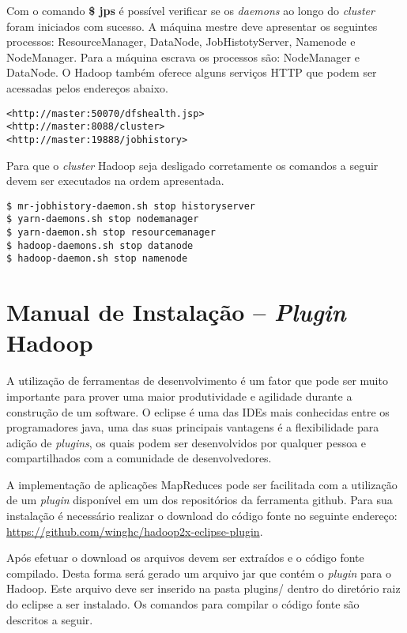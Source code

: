 \begin{apendicesenv}
Com o comando \textbf{\$ jps} é possível verificar se os \textit{daemons} ao longo do \textit{cluster} foram iniciados com sucesso. A máquina mestre deve apresentar os seguintes processos: ResourceManager, DataNode, JobHistotyServer, Namenode e NodeManager. Para a máquina escrava os processos são: NodeManager e DataNode. O Hadoop também oferece alguns serviços HTTP que podem ser acessadas pelos endereços abaixo.

\begin{lstlisting}[style=abnt,frame=single]
<http://master:50070/dfshealth.jsp>
<http://master:8088/cluster>
<http://master:19888/jobhistory>
\end{lstlisting}

Para que o \textit{cluster} Hadoop seja desligado corretamente os comandos a seguir devem ser executados na ordem apresentada.

\begin{lstlisting}[style=abnt,frame=single]
$ mr-jobhistory-daemon.sh stop historyserver 
$ yarn-daemons.sh stop nodemanager 
$ yarn-daemon.sh stop resourcemanager 
$ hadoop-daemons.sh stop datanode 
$ hadoop-daemon.sh stop namenode
\end{lstlisting}

\chapter{Manual de Instalação – \textit{Plugin} Hadoop}
\label{apd-eclipse}

A utilização de ferramentas de desenvolvimento é um fator que pode ser muito importante para prover uma maior produtividade e agilidade durante a construção de um software. O eclipse é uma das IDEs mais conhecidas entre os programadores java, uma das suas principais vantagens é a flexibilidade para adição de \textit{plugins}, os quais podem ser desenvolvidos por qualquer pessoa e compartilhados com a comunidade de desenvolvedores.

A implementação de aplicações MapReduces pode ser facilitada com a utilização de um \textit{plugin} disponível em um dos repositórios da ferramenta github. Para sua instalação é necessário realizar o download do código fonte no seguinte endereço: \url{https://github.com/winghc/hadoop2x-eclipse-plugin}.

Após efetuar o download os arquivos devem ser extraídos e o código fonte compilado. Desta forma será gerado um arquivo jar que contém o \textit{plugin} para o Hadoop. Este arquivo deve ser inserido na pasta plugins/ dentro do diretório raiz do eclipse a ser instalado. Os comandos para compilar o código fonte são descritos a seguir.


\end{apendicesenv}
